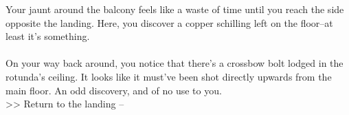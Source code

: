Your jaunt around the balcony feels like a waste of time until you reach the side opposite the landing. Here, you discover a copper schilling left on the floor--at least it's something.\\
\\

On your way back around, you notice that there's a crossbow bolt lodged in the rotunda's ceiling. It looks like it must've been shot directly upwards from the main floor. An odd discovery, and of no use to you.\\

>> Return to the landing -- 
